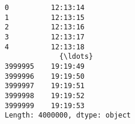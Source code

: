             \begin{tcolorbox}[breakable, size=fbox, boxrule=.5pt, pad at break*=1mm, opacityfill=0]
\begin{Verbatim}[commandchars=\\\{\}]
0          12:13:14
1          12:13:15
2          12:13:16
3          12:13:17
4          12:13:18
             {\ldots}
3999995    19:19:49
3999996    19:19:50
3999997    19:19:51
3999998    19:19:52
3999999    19:19:53
Length: 4000000, dtype: object
\end{Verbatim}
\end{tcolorbox}
